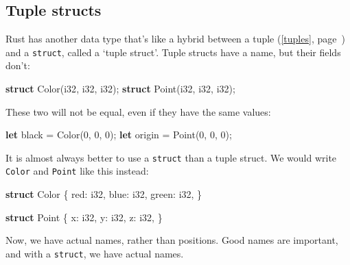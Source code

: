 \documentclass[a4paper,]{book}
\renewcommand*{\hyperref}[2][\ar]{%
  \def\ar{#2}%
  #2 (\autoref{#1}, page~\pageref{#1})}
\newenvironment{Shaded}{\begin{snugshade}}{\end{snugshade}}
\newcommand{\KeywordTok}[1]{\textcolor[rgb]{0.13,0.29,0.53}{\textbf{{#1}}}}
\newcommand{\DataTypeTok}[1]{\textcolor[rgb]{0.13,0.29,0.53}{{#1}}}
\newcommand{\DecValTok}[1]{\textcolor[rgb]{0.00,0.00,0.81}{{#1}}}
\newcommand{\NormalTok}[1]{{#1}}
\begin{document}
\subsection{Tuple structs}\label{tuple-structs}

Rust has another data type that's like a hybrid between a
\hyperref[tuples]{tuple} and a \texttt{struct}, called a `tuple struct'.
Tuple structs have a name, but their fields don't:

\begin{Shaded}
\begin{Highlighting}[]
\KeywordTok{struct} \NormalTok{Color(}\DataTypeTok{i32}\NormalTok{, }\DataTypeTok{i32}\NormalTok{, }\DataTypeTok{i32}\NormalTok{);}
\KeywordTok{struct} \NormalTok{Point(}\DataTypeTok{i32}\NormalTok{, }\DataTypeTok{i32}\NormalTok{, }\DataTypeTok{i32}\NormalTok{);}
\end{Highlighting}
\end{Shaded}

These two will not be equal, even if they have the same values:

\begin{Shaded}
\begin{Highlighting}[]
\KeywordTok{let} \NormalTok{black = Color(}\DecValTok{0}\NormalTok{, }\DecValTok{0}\NormalTok{, }\DecValTok{0}\NormalTok{);}
\KeywordTok{let} \NormalTok{origin = Point(}\DecValTok{0}\NormalTok{, }\DecValTok{0}\NormalTok{, }\DecValTok{0}\NormalTok{);}
\end{Highlighting}
\end{Shaded}

It is almost always better to use a \texttt{struct} than a tuple struct.
We would write \texttt{Color} and \texttt{Point} like this instead:

\begin{Shaded}
\begin{Highlighting}[]
\KeywordTok{struct} \NormalTok{Color \{}
    \NormalTok{red: }\DataTypeTok{i32}\NormalTok{,}
    \NormalTok{blue: }\DataTypeTok{i32}\NormalTok{,}
    \NormalTok{green: }\DataTypeTok{i32}\NormalTok{,}
\NormalTok{\}}

\KeywordTok{struct} \NormalTok{Point \{}
    \NormalTok{x: }\DataTypeTok{i32}\NormalTok{,}
    \NormalTok{y: }\DataTypeTok{i32}\NormalTok{,}
    \NormalTok{z: }\DataTypeTok{i32}\NormalTok{,}
\NormalTok{\}}
\end{Highlighting}
\end{Shaded}

Now, we have actual names, rather than positions. Good names are
important, and with a \texttt{struct}, we have actual names.
\end{document}
